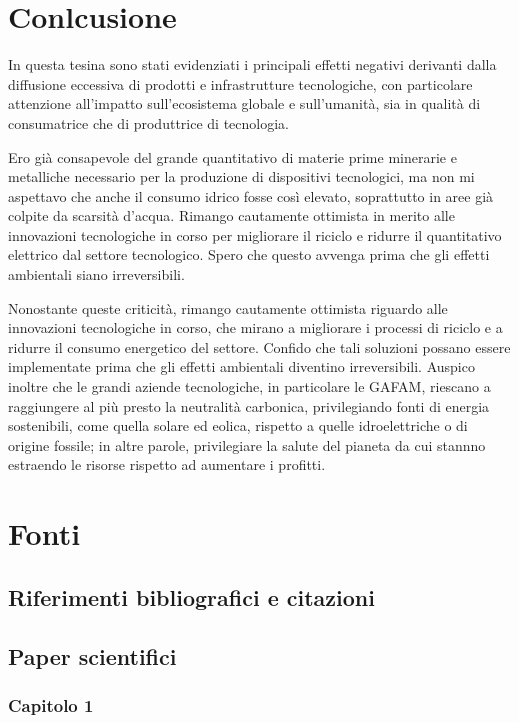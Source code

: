 \documentclass[12pt,a4paper,oneside]{book}
\begin{document}
\chapter{Conlcusione}

In questa tesina sono stati evidenziati i principali effetti negativi derivanti dalla diffusione eccessiva di prodotti e infrastrutture tecnologiche, con particolare attenzione all’impatto sull’ecosistema globale e sull’umanità, sia in qualità di consumatrice che di produttrice di tecnologia.

Ero già consapevole del grande quantitativo di materie prime minerarie e metalliche necessario per la produzione di dispositivi tecnologici, ma non mi aspettavo che anche il consumo idrico fosse così elevato, soprattutto in aree già colpite da scarsità d’acqua.
Rimango cautamente ottimista in merito alle innovazioni tecnologiche in corso per migliorare il riciclo e ridurre il quantitativo elettrico dal settore tecnologico. Spero che questo avvenga prima che gli effetti ambientali siano irreversibili. 

Nonostante queste criticità, rimango cautamente ottimista riguardo alle innovazioni tecnologiche in corso, che mirano a migliorare i processi di riciclo e a ridurre il consumo energetico del settore. Confido che tali soluzioni possano essere implementate prima che gli effetti ambientali diventino irreversibili.
Auspico inoltre che le grandi aziende tecnologiche, in particolare le GAFAM, riescano a raggiungere al più presto la neutralità carbonica, privilegiando fonti di energia sostenibili, come quella solare ed eolica, rispetto a quelle idroelettriche o di origine fossile; in altre parole, privilegiare la salute del pianeta da cui stannno estraendo le risorse rispetto ad aumentare i profitti.

\newpage

\chapter*{Fonti}
\renewcommand{\bibsection}{}
\section*{Riferimenti bibliografici e citazioni}
\nocite{*}


\section*{Paper scientifici}
\subsection*{Capitolo 1}
\sloppy
\end{document}
